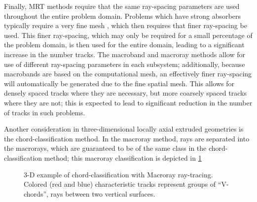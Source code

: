 {{    Finally, \ac{MRT} methods require that the same ray-spacing parameters are used throughout the entire problem domain.
    Problems which have strong absorbers typically require a very fine mesh \cite{Fitzgerald2019}, which then requires that finer ray-spacing be used.
    This finer ray-spacing, which may only be required for a small percentage of the problem domain, is then used for the entire domain, leading to a significant increase in the number tracks.
    The macroband and macroray methods allow for use of different ray-spacing parameters in each subsystem; additionally, because macrobands are based on the computational mesh, an effectively finer ray-spacing will automatically be generated due to the fine spatial mesh.
    This allows for densely spaced tracks where they are necessary, but more coarsely spaced tracks where they are not; this is expected to lead to significant reduction in the number of tracks in such problems.

    Another consideration in three-dimensional locally axial extruded geometries is the chord-classification method.
    In the macroray method, rays are separated into the macrorays, which are guaranteed to be of the same class in the chord-classification method;
    this macroray classification is depicted in \cref{fig:RT:Chord-Classification Macroray}

    \begin{figure}[h]
      \centering
      \def\svgwidth{0.45\linewidth}
      
      \caption{3-D example of chord-classification with Macroray ray-tracing. Colored (red and blue) characteristic tracks represent groups of ``V-chords'', rays between two vertical surfaces.}
      \label{fig:RT:Chord-Classification Macroray}
    \end{figure}
  }

  \printbibliography
}
